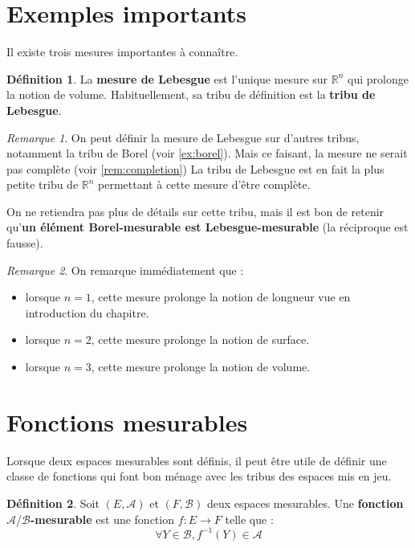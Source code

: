 \documentclass[french]{report}
\theoremstyle{plain}
\theoremstyle{definition}
\newtheorem{defi}{Définition}[section]
\theoremstyle{remark}
\newtheorem{rem}{Remarque}[section]
\newcommand\itemb{\item[$\bullet$]}
\begin{document}
\section{Exemples importants}
Il existe trois mesures importantes à connaître.

\begin{defi}
  La \textbf{mesure de Lebesgue} est l'unique mesure sur $\mathbb{R}^n$ qui prolonge la notion de volume.
  Habituellement, sa tribu de définition est la \textbf{tribu de Lebesgue}.
\end{defi}

\begin{rem}
  On peut définir la mesure de Lebesgue sur d'autres tribus, notamment la tribu de Borel (voir \ref{ex:borel}). Mais ce faisant, la mesure ne serait pas complète (voir \ref{rem:completion})
  La tribu de Lebesgue est en fait la plus petite tribu de $\mathbb{R}^n$ permettant à cette mesure d'être complète.
  
  On ne retiendra pas plus de détails sur cette tribu, mais il est bon de retenir qu'\textbf{un élément Borel-mesurable est Lebesgue-mesurable} (la réciproque est fausse).
\end{rem}

\begin{rem}
  On remarque immédiatement que :
  \begin{itemize}
    \itemb lorsque $n=1$, cette mesure prolonge la notion de longueur vue en introduction du chapitre.
    \itemb lorsque $n=2$, cette mesure prolonge la notion de surface.
    \itemb lorsque $n=3$, cette mesure prolonge la notion de volume.
  \end{itemize}
\end{rem}


\section{Fonctions mesurables}

Lorsque deux espaces mesurables sont définis, il peut être utile de définir une classe de fonctions qui font bon ménage avec les tribus des espaces mis en jeu.

\begin{defi}
  Soit $\left(E, \mathcal{A}\right)$ et $\left(F, \mathcal{B}\right)$ deux espaces mesurables.
  Une \textbf{fonction } $\mathcal{A}$/$\mathcal{B}$\textbf{-mesurable} est une fonction $f : E \longrightarrow F$ telle que :
  $$ \forall Y \in \mathcal{B}, f^{-1}(Y) \in \mathcal{A} $$
\end{defi}
\end{document}
